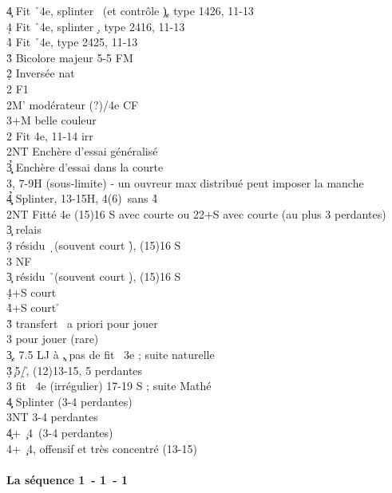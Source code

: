 \documentclass[a4paper]{article}
\begin{document}
\begin{bidtable}
4\c \> Fit \h\ 4e, splinter \s\ (et contrôle \c ), type 1426, 11-13\\
4\d \> Fit \h\ 4e, splinter \d , type 2416, 11-13\\
4\h \> Fit \h\ 4e, type 2425, 11-13\-\\
3\h \> Bicolore majeur 5-5 FM\-\\
2\d\h \> Inversée nat\+\\
2\s \> F1\\
2M' \> modérateur (?)/4e CF\\
3\s {}+M belle couleur\-\\
2\s \> Fit 4e, 11-14 irr\+\\
2NT \> Enchère d'essai généralisé\\
3\c\d\h \> Enchère d'essai dans la courte\\
3\s {}\s , 7-9H (sous-limite) - un ouvreur max distribué peut imposer la manche\\
4\c\d\h \> Splinter, 13-15H, 4(6)\s\ sans 4\h \-\\
2NT \> Fitté 4e (15)16 S avec courte ou 22+S avec courte (au plus 3 perdantes)\+\\
3\c \> relais\+\\
3\d \> résidu \d\ (souvent court \h ), (15)16 S\+\\
3\s \> NF\-\\
3\c \> résidu \h\ (souvent court \d ), (15)16 S\\
4\d {}+S court \d \\
4\h {}+S court \h \-\\
3\h \> transfert \s\ a priori pour jouer\\
3\s \> pour jouer (rare)\-\\
3\c {}, 7.5 LJ à \c , pas de fit \s\ 3e ; suite naturelle\\
3\d\h {}\c\ 5\d /\h , (12)13-15, 5 perdantes\\
3\s \> fit \s\ 4e (irrégulier) 17-19 S ; suite Mathé\\
4\c\d \> Splinter (3-4 perdantes)\\
3NT  3-4 perdantes\\
4\c {}+ \c\ 4\s\ (3-4 perdantes)\\
4\s {}+ \c\ 4\s , offensif et très concentré (13-15)
\end{bidtable}

\paragraph{La séquence 1\pdfc\ - 1\pdfh\ - 1\pdfs}
\end{document}
